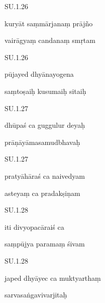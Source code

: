 \documentclass{article}
\begin{document}

    
	
	    
		SU.1.26 
    
	    
		kuryāt saṃmārjanaṃ prājño 
    
	    
		vairāgyaṃ candanaṃ smṛtam 
    

    
	
	    
		SU.1.26 
    
	    
		pūjayed dhyānayogena 
    
	    
		saṃtoṣaiḥ kusumaiḥ sitaiḥ 
    

    
	
	    
		SU.1.27 
    
	    
		dhūpaś ca guggulur deyaḥ 
    
	    
		prāṇāyāmasamudbhavaḥ 
    

    
	
	    
		SU.1.27 
    
	    
		pratyāhāraś ca naivedyam 
    
	    
		asteyaṃ ca pradakṣiṇam 
    

    
	
	    
		SU.1.28 
    
	    
		iti divyopacāraiś ca 
    
	    
		saṃpūjya paramaṃ śivam 
    

    
	
	    
		SU.1.28 
    
	    
		japed dhyāyec ca muktyarthaṃ 
    
	    
		sarvasaṅgavivarjitaḥ 
    

    
	
\end{document}
